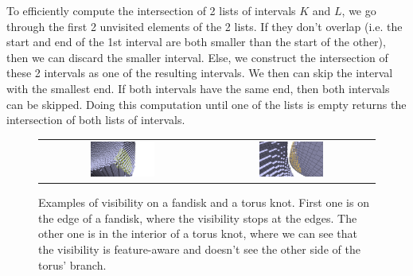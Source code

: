 \documentclass[runningheads]{llncs}
\begin{document}
    To efficiently compute the intersection of 2 lists of intervals $K$ and $L$, we go through the first 2 unvisited
    elements of the 2 lists. If they don't overlap (i.e. the start and end of the 1st interval are both smaller than
    the start of the other), then we can discard the smaller interval. Else, we construct the intersection of these
    2 intervals as one of the resulting intervals. We then can skip the interval with the smallest end. If both
    intervals have the same end, then both intervals can be skipped. Doing this computation until one of the lists
    is empty returns the intersection of both lists of intervals.


    \begin{figure}
        \centering
        \begin{tabular}{c c}
            \includegraphics[width=0.4\textwidth]{pictures/visibility_from_given_point_r_10} &
            \includegraphics[width=0.4\textwidth]{pictures/visibility_aware_of_features}
        \end{tabular}
        \caption{Examples of visibility on a fandisk and a torus knot. First one is on the edge
        of a fandisk, where the visibility stops at the edges. The other one is in the interior
        of a torus knot, where we can see that the visibility is feature-aware and doesn't see
        the other side of the torus' branch.}
        \label{fig:visibility-examples}
    \end{figure}
%
\end{document}
